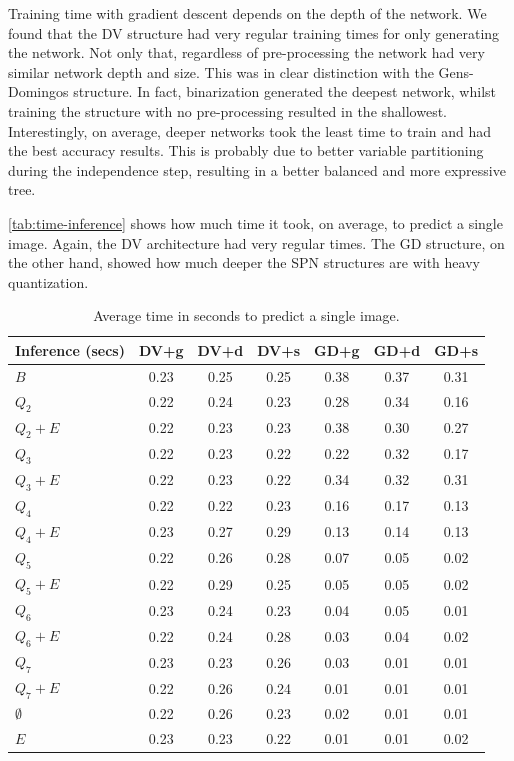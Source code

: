 Training time with gradient descent depends on the depth of the network. We found that the DV
structure had very regular training times for only generating the network. Not only that,
regardless of pre-processing the network had very similar network depth and size. This was in clear
distinction with the Gens-Domingos structure. In fact, binarization generated the deepest network,
whilst training the structure with no pre-processing resulted in the shallowest. Interestingly,
on average, deeper networks took the least time to train and had the best accuracy results. This is
probably due to better variable partitioning during the independence step, resulting in a better
balanced and more expressive tree.

\autoref{tab:time-inference} shows how much time it took, on average, to predict a single image.
Again, the DV architecture had very regular times. The GD structure, on the other hand, showed how
much deeper the SPN structures are with heavy quantization.

\begin{table}[h]
  \centering
  \begin{tabular}{l|c|c|c|c|c|c}
    \hline
    \multicolumn{1}{c}{\bfseries Inference (secs)} & \multicolumn{1}{c}{\bfseries DV+g} &
    \multicolumn{1}{c}{\bfseries DV+d} & \multicolumn{1}{c}{\bfseries DV+s} &
    \multicolumn{1}{c}{\bfseries GD+g} & \multicolumn{1}{c}{\bfseries GD+d} &
    \multicolumn{1}{c}{\bfseries GD+s}\\
    \hline
    $B$         & 0.23 & 0.25 & 0.25 & 0.38 & 0.37 & 0.31 \\
    $Q_2$       & 0.22 & 0.24 & 0.23 & 0.28 & 0.34 & 0.16 \\
    $Q_2+E$     & 0.22 & 0.23 & 0.23 & 0.38 & 0.30 & 0.27 \\
    $Q_3$       & 0.22 & 0.23 & 0.22 & 0.22 & 0.32 & 0.17 \\
    $Q_3+E$     & 0.22 & 0.23 & 0.22 & 0.34 & 0.32 & 0.31 \\
    $Q_4$       & 0.22 & 0.22 & 0.23 & 0.16 & 0.17 & 0.13 \\
    $Q_4+E$     & 0.23 & 0.27 & 0.29 & 0.13 & 0.14 & 0.13 \\
    $Q_5$       & 0.22 & 0.26 & 0.28 & 0.07 & 0.05 & 0.02 \\
    $Q_5+E$     & 0.22 & 0.29 & 0.25 & 0.05 & 0.05 & 0.02 \\
    $Q_6$       & 0.23 & 0.24 & 0.23 & 0.04 & 0.05 & 0.01 \\
    $Q_6+E$     & 0.22 & 0.24 & 0.28 & 0.03 & 0.04 & 0.02 \\
    $Q_7$       & 0.23 & 0.23 & 0.26 & 0.03 & 0.01 & 0.01 \\
    $Q_7+E$     & 0.22 & 0.26 & 0.24 & 0.01 & 0.01 & 0.01 \\
    $\emptyset$ & 0.22 & 0.26 & 0.23 & 0.02 & 0.01 & 0.01 \\
    $E$         & 0.23 & 0.23 & 0.22 & 0.01 & 0.01 & 0.02 \\
  \end{tabular}
  \caption{Average time in seconds to predict a single image.\label{tab:time-inference}}
\end{table}
